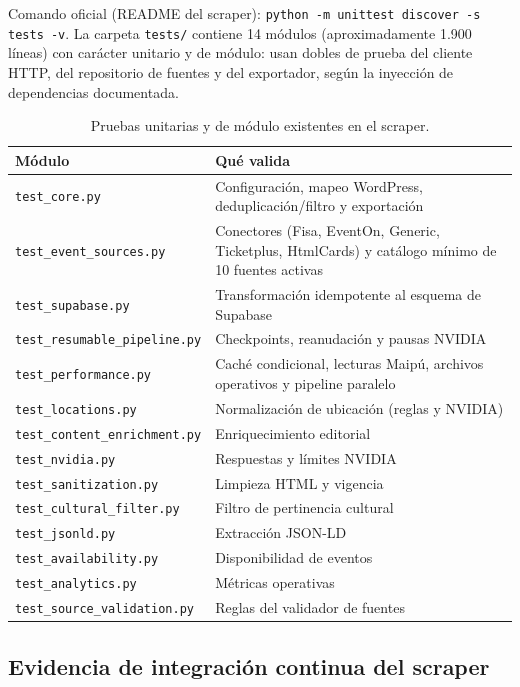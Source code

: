 Comando oficial (README del scraper): \texttt{python -m unittest discover -s tests -v}.
La carpeta \texttt{tests/} contiene 14 módulos (aproximadamente 1.900 líneas) con carácter
unitario y de módulo: usan dobles de prueba del cliente HTTP, del repositorio de fuentes y
del exportador, según la inyección de dependencias documentada.

\begin{table}[ht]
\centering\small
\renewcommand{\arraystretch}{1.2}
\begin{tabular}{l p{9.6cm}}
\toprule
\textbf{Módulo} & \textbf{Qué valida} \\
\midrule
\texttt{test\_core.py} & Configuración, mapeo WordPress, deduplicación/filtro y exportación \\
\texttt{test\_event\_sources.py} & Conectores (Fisa, EventOn, Generic, Ticketplus, HtmlCards) y catálogo mínimo de 10 fuentes activas \\
\texttt{test\_supabase.py} & Transformación idempotente al esquema de Supabase \\
\texttt{test\_resumable\_pipeline.py} & Checkpoints, reanudación y pausas NVIDIA \\
\texttt{test\_performance.py} & Caché condicional, lecturas Maipú, archivos operativos y pipeline paralelo \\
\texttt{test\_locations.py} & Normalización de ubicación (reglas y NVIDIA) \\
\texttt{test\_content\_enrichment.py} & Enriquecimiento editorial \\
\texttt{test\_nvidia.py} & Respuestas y límites NVIDIA \\
\texttt{test\_sanitization.py} & Limpieza HTML y vigencia \\
\texttt{test\_cultural\_filter.py} & Filtro de pertinencia cultural \\
\texttt{test\_jsonld.py} & Extracción JSON-LD \\
\texttt{test\_availability.py} & Disponibilidad de eventos \\
\texttt{test\_analytics.py} & Métricas operativas \\
\texttt{test\_source\_validation.py} & Reglas del validador de fuentes \\
\bottomrule
\end{tabular}
\caption{Pruebas unitarias y de módulo existentes en el scraper.}
\label{tab:tests}
\end{table}

\subsection{Evidencia de integración continua del scraper}

